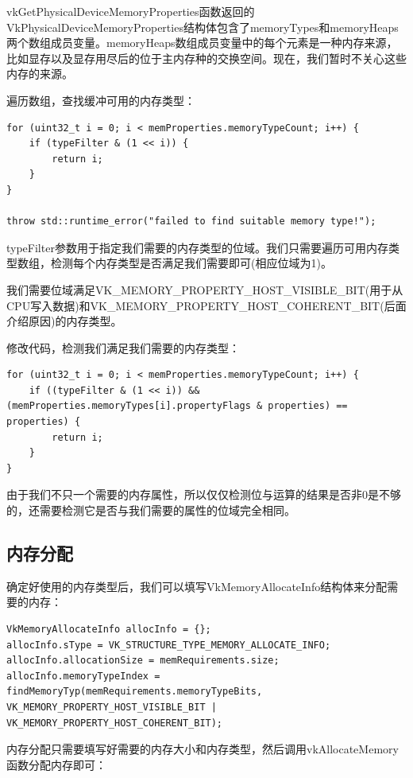 \documentclass{ctexart}
\begin{document}
vkGetPhysicalDeviceMemoryProperties函数返回的VkPhysicalDeviceMemoryProperties结构体包含了memoryTypes和memoryHeaps两个数组成员变量。memoryHeaps数组成员变量中的每个元素是一种内存来源，比如显存以及显存用尽后的位于主内存种的交换空间。现在，我们暂时不关心这些内存的来源。

遍历数组，查找缓冲可用的内存类型：

\begin{lstlisting}[language={[ANSI]C}]
for (uint32_t i = 0; i < memProperties.memoryTypeCount; i++) {
	if (typeFilter & (1 << i)) {
		return i;
	}
}

throw std::runtime_error("failed to find suitable memory type!");
\end{lstlisting}

typeFilter参数用于指定我们需要的内存类型的位域。我们只需要遍历可用内存类型数组，检测每个内存类型是否满足我们需要即可(相应位域为1)。

我们需要位域满足VK\_MEMORY\_PROPERTY\_HOST\_VISIBLE\_BIT(用于从CPU写入数据)和VK\_MEMORY\_PROPERTY\_HOST\_COHERENT\_BIT(后面介绍原因)的内存类型。

修改代码，检测我们满足我们需要的内存类型：

\begin{lstlisting}[language={[ANSI]C}]
for (uint32_t i = 0; i < memProperties.memoryTypeCount; i++) {
	if ((typeFilter & (1 << i)) && (memProperties.memoryTypes[i].propertyFlags & properties) == properties) {
		return i;
	}
}
\end{lstlisting}

由于我们不只一个需要的内存属性，所以仅仅检测位与运算的结果是否非0是不够的，还需要检测它是否与我们需要的属性的位域完全相同。

\subsection{内存分配}

确定好使用的内存类型后，我们可以填写VkMemoryAllocateInfo结构体来分配需要的内存：

\begin{lstlisting}[language={[ANSI]C}]
VkMemoryAllocateInfo allocInfo = {};
allocInfo.sType = VK_STRUCTURE_TYPE_MEMORY_ALLOCATE_INFO;
allocInfo.allocationSize = memRequirements.size;
allocInfo.memoryTypeIndex = findMemoryTyp(memRequirements.memoryTypeBits, VK_MEMORY_PROPERTY_HOST_VISIBLE_BIT | VK_MEMORY_PROPERTY_HOST_COHERENT_BIT);
\end{lstlisting}

内存分配只需要填写好需要的内存大小和内存类型，然后调用vkAllocateMemory函数分配内存即可：
\end{document}
